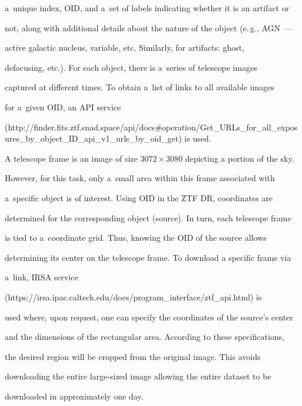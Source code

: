 a~unique index, OID, and a~set of labels indicating whether it is an artifact or 

not, along with additional details about the nature of the object (e.\,g., AGN~---

active galactic nucleus, variable, etc. Similarly, for artifacts: ghost, 

defocusing, etc.). For each object, there is a~series of telescope images 

captured at different times. To obtain a~list of links to all available images 

for a~given OID, an API service 

({\sf http://finder.fits.ztf.snad.space/\linebreak  api/docs\#operation/Get\_URLs\_for\_all\_exposures\_by\_object\_ID\_api\_v1\_urls\_by\_oid\_\linebreak get}) is used.







A telescope frame is an image of size $3072\times3080$ depicting a portion of the sky. 

However, for this task, only a~small area within this frame associated with 

a~specific object is of interest. Using OID in the ZTF DR, coordinates are 

determined for the corresponding object (source). In turn, each telescope frame 

is tied to a~coordinate grid. Thus, knowing the OID of the source allows 

determining its center on the telescope frame. To download a specific frame via 

a~link, IRSA service 

({\sf https://irsa.ipac.caltech.edu/docs/program\_interface/ztf\_api.html}) is 

used where, upon request, one can specify the coordinates of the source's center 

and the dimensions of the rectangular area. According to these specifications, 

the desired region will be cropped from the original image. This avoids 

downloading the entire large-sized image allowing the entire dataset to be 

downloaded in approximately one day.





